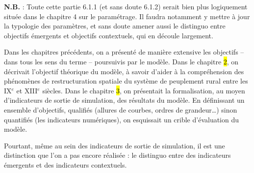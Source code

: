 \begin{tcolorbox}[breakable,left=0pt,right=0pt,top=0pt,bottom=0pt,
	colback=yellow!50,colframe=black,width=\dimexpr\textwidth\relax, 
	enlarge left by=0mm, boxsep=5pt,arc=0pt,outer arc=0pt]
\textbf{N.B.} : Toute cette partie 6.1.1 (et sans doute 6.1.2) serait bien plus logiquement située dans le chapitre 4 sur le paramétrage.
Il faudra notamment y mettre à jour la typologie des paramètres, et sans doute amener aussi le distinguo entre objectifs émergents et objectifs contextuels, qui en découle largement.
\end{tcolorbox}

Dans les chapitres précédents, on a présenté de manière extensive les objectifs -- dans tous les sens du terme -- poursuivis par le modèle.
Dans le chapitre \hl{2}, on décrivait l'objectif théorique du modèle, à savoir d'aider à la compréhension des phénomènes de restructuration spatiale du système de peuplement rural entre les IX$^e$ et XIII$^e$ siècles.
Dans le chapitre \hl{3}, on présentait la formalisation, au moyen d'indicateurs de sortie de simulation, des résultats du modèle.
En définissant un ensemble d'objectifs, qualifiés (allures de courbes, ordres de grandeur\ldots) sinon quantifiés (les indicateurs numériques), on esquissait un crible d'évaluation du modèle.

Pourtant, même au sein des indicateurs de sortie de simulation, il est une distinction que l'on a pas encore réalisée : le distinguo entre des indicateurs \og émergents\fg{} et des indicateurs \og contextuels\fg{}.

